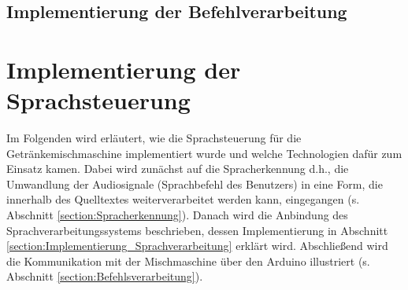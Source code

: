 \subsection{Implementierung der Befehlverarbeitung}
\section{Implementierung der Sprachsteuerung}
Im Folgenden wird erläutert, wie die Sprachsteuerung für die Getränkemischmaschine implementiert wurde und welche Technologien dafür zum Einsatz kamen. Dabei wird zunächst auf die Spracherkennung d.h., die Umwandlung der Audiosignale (Sprachbefehl des Benutzers) in eine Form, die innerhalb des Quelltextes weiterverarbeitet werden kann, eingegangen (s. Abschnitt \ref{section:Spracherkennung}). Danach wird die Anbindung des Sprachverarbeitungssystems beschrieben, dessen Implementierung in Abschnitt \ref{section:Implementierung_Sprachverarbeitung} erklärt wird. Abschließend wird die Kommunikation mit der Mischmaschine über den Arduino illustriert (s. Abschnitt \ref{section:Befehlsverarbeitung}).

